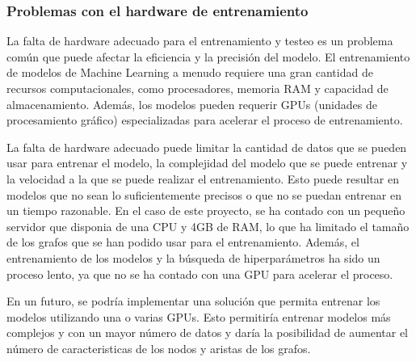 \subsubsection{Problemas con el hardware de entrenamiento}
La falta de hardware adecuado para el entrenamiento y testeo es un problema común 
que puede afectar la eficiencia y la precisión del modelo. El entrenamiento de modelos 
de Machine Learning a menudo requiere una gran cantidad de recursos computacionales, 
como procesadores, memoria RAM y capacidad de almacenamiento. Además, los modelos 
pueden requerir GPUs (unidades de procesamiento gráfico) especializadas para acelerar 
el proceso de entrenamiento.\medskip

La falta de hardware adecuado puede limitar la cantidad de datos que se pueden usar 
para entrenar el modelo, la complejidad del modelo que se puede entrenar y la 
velocidad a la que se puede realizar el entrenamiento. Esto puede resultar en 
modelos que no sean lo suficientemente precisos o que no se puedan entrenar en 
un tiempo razonable. En el caso de este proyecto, se ha contado con un pequeño
servidor que disponia de una CPU y 4GB de RAM, lo que ha limitado el tamaño de los
grafos que se han podido usar para el entrenamiento. Además, el entrenamiento de
los modelos y la búsqueda de hiperparámetros ha sido un proceso lento, ya que
no se ha contado con una GPU para acelerar el proceso.\medskip

En un futuro, se podría implementar una solución que permita entrenar los modelos
utilizando una o varias GPUs. Esto permitiría entrenar modelos más complejos y
con un mayor número de datos y daría la posibilidad de aumentar el número de
caracteristicas de los nodos y aristas de los grafos.
